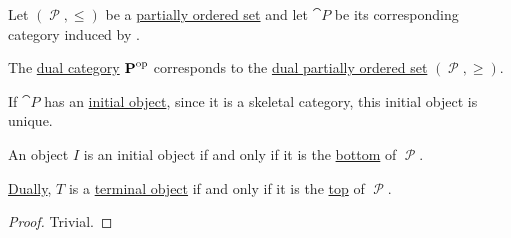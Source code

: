 \begin{proposition}\label{thm:order_category_isomorphism_properties}
  Let \( (\mscrP, \leq) \) be a \hyperref[def:partially_ordered_set]{partially ordered set} and let \( \cat{P} \) be its corresponding category induced by .

  \begin{thmenum}
     The \hyperref[def:dual_category]{dual category} \( \operatorname{\mathbf{P}}^{\operatorname{op}} \) corresponds to the \hyperref[def:partially_ordered_set/duality]{dual partially ordered set} \( (\mscrP, \geq) \).

     If \( \cat{P} \) has an \hyperref[def:universal_objects/initial]{initial object}, since it is a skeletal category, this initial object is unique.

    An object \( I \) is an initial object if and only if it is the \hyperref[def:semilattice/meet]{bottom} of \( \mscrP \).

    \hyperref[thm:categorical_principle_of_duality]{Dually}, \( T \) is a \hyperref[def:universal_objects/terminal]{terminal object} if and only if it is the \hyperref[def:semilattice/join]{top} of \( \mscrP \).
  \end{thmenum}
\end{proposition}
\begin{proof}
  Trivial.
\end{proof}
